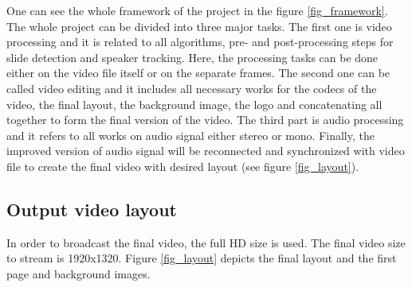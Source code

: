 \documentclass[[12pt,DIV14,BCOR12mm,a4paper,footexclude,headinclude,halfparskip-,twoside,openright,cleardoubleempty,idxtotoc,bibtotoc]{article}
\begin{document}
One can see the whole framework of the project in the figure \ref{fig_framework}. The whole project can be divided into three major tasks. The first one is video processing and it is related to all algorithms, pre- and post-processing steps for slide detection and speaker tracking. Here, the processing tasks can be done either on the video file itself or on the separate frames. The second one can be called video editing and it includes all necessary works for the codecs of the video, the final layout, the background image, the logo and concatenating all together to form the final version of the video. The third part is audio processing and it refers to all works on audio signal either stereo or mono. Finally, the improved version of audio signal will be reconnected and synchronized with video file to create the final video with desired layout (see figure \ref{fig_layout}). 


\subsection{Output video layout}

In order to broadcast the final video, the full HD size is used. The final video size to stream is 1920x1320. Figure \ref{fig_layout} depicts the final layout and the first page and background images.
\end{document}
